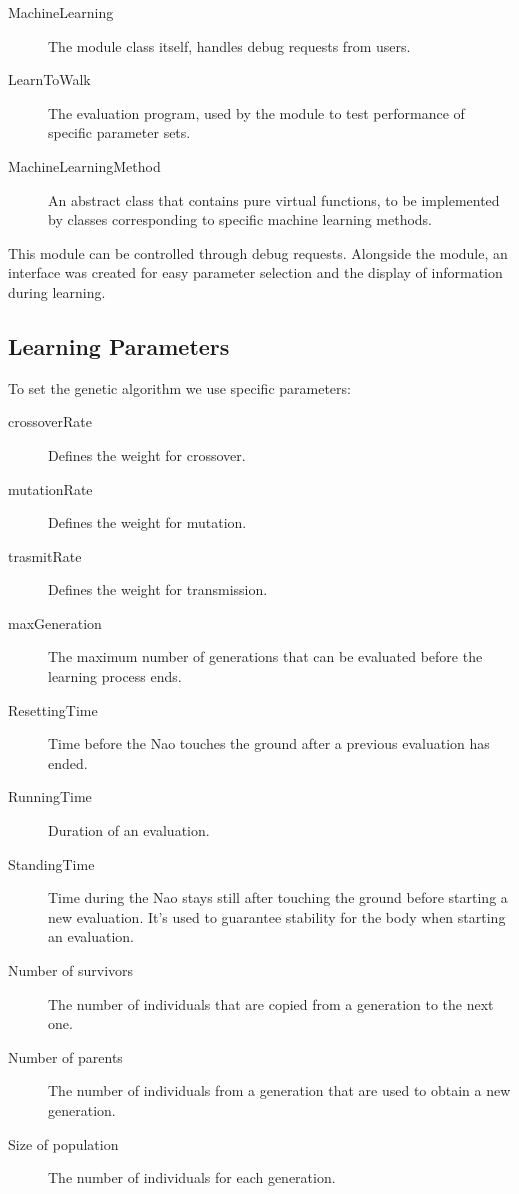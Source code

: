 \documentclass{article}
\begin{document}
\begin{description}
\item[MachineLearning] The module class itself, handles debug requests from users.
\item[LearnToWalk] The evaluation program, used by the module to test performance of specific parameter sets.
\item[MachineLearningMethod] An abstract class that contains pure virtual functions, to be implemented by classes corresponding to specific machine learning methods.
\end{description}

This module can be controlled through debug requests. Alongside the module, an interface was created for easy parameter selection and the display of information during learning.

\subsection{Learning Parameters}

To set the genetic algorithm we use specific parameters:

\begin{description}
\item[crossoverRate] Defines the weight for crossover.
\item[mutationRate] Defines the weight for mutation.
\item[trasmitRate] Defines the weight for transmission.
\item[maxGeneration] The maximum number of generations that can be evaluated before the learning process ends. 

\item[ResettingTime] Time before the Nao touches the ground after a previous evaluation has ended.
\item[RunningTime] Duration of an evaluation.
\item[StandingTime] Time during the Nao stays still after touching the ground before starting a new evaluation. It's used to guarantee stability for the body when starting an evaluation.
\item[Number of survivors] The number of individuals that are copied from a generation to the next one. 
\item[Number of parents] The number of individuals from a generation that are used to obtain a new generation.
\item[Size of population] The number of individuals for each generation.

\end{description}
\end{document}
